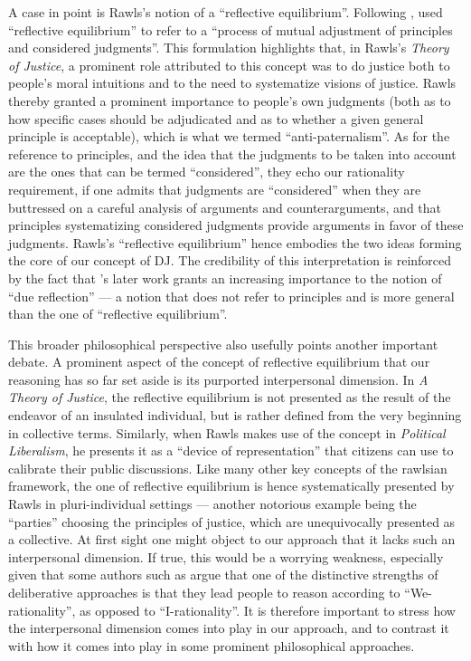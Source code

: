 \documentclass[version=3.21, pagesize, twoside=off, bibliography=totoc, DIV=calc, fontsize=12pt, a4paper, french, english]{scrartcl}
\begin{document}
A case in point is Rawls’s notion of a “reflective equilibrium”. 
Following \citet{goodman_fact_1983}, \citet[][p.18]{rawls_theory_1999} used “reflective equilibrium” to refer to a “process of mutual adjustment of principles and considered judgments”. 
This formulation highlights that, in Rawls's \emph{Theory of Justice}, a prominent role attributed to this concept was to do justice both to people's moral intuitions and to the need to systematize visions of justice. 
Rawls thereby granted a prominent importance to people's own judgments (both as to how specific cases should be adjudicated and as to whether a given general principle is acceptable), which is what we termed  “anti-paternalism”. 
As for the reference to principles, and the idea that the judgments to be taken into account are the ones that can be termed “considered”, they echo our rationality requirement, if one admits that judgments are  “considered” when they are buttressed on a careful analysis of arguments and counterarguments, and that principles systematizing considered judgments provide arguments in favor of these judgments. 
Rawls's “reflective equilibrium” hence embodies the two ideas forming the core of our concept of \ac{DJ}. 
The credibility of this interpretation is reinforced by the fact that \citeauthor{rawls_political_2005}’s \citeyearpar{rawls_political_2005} later work grants an increasing importance to the notion of “due reflection” --- a notion that does not refer to principles and is more general than the one of “reflective equilibrium”. 

This broader philosophical perspective also usefully points another important debate. 
A prominent aspect of the concept of reflective equilibrium that our reasoning has so far set aside is its purported interpersonal dimension. 
In \emph{A Theory of Justice}, the reflective equilibrium is not presented as the result of the endeavor of an insulated individual, but is rather defined from the very beginning in collective terms. 
Similarly, when Rawls makes use of the concept in \emph{Political Liberalism}, he presents it as a  “device of representation” that citizens can use to calibrate their public discussions. 
Like many other key concepts of the rawlsian framework, the one of reflective equilibrium is hence systematically presented by Rawls in pluri-individual settings --- another notorious example being the “parties” choosing the principles of justice, which are unequivocally presented as a collective. 
At first sight one might object to our approach that it lacks such an interpersonal dimension.
If true, this would be a worrying weakness, especially given that some authors such as \citet{vatn_institutional_2009} argue that one of the distinctive strengths of deliberative approaches is that they lead people to reason according to ``We-rationality'', as opposed to ``I-rationality''. 
It is therefore important to stress how the interpersonal dimension comes into play in our approach, and to contrast it with how it comes into play in some prominent philosophical approaches.
\end{document}
